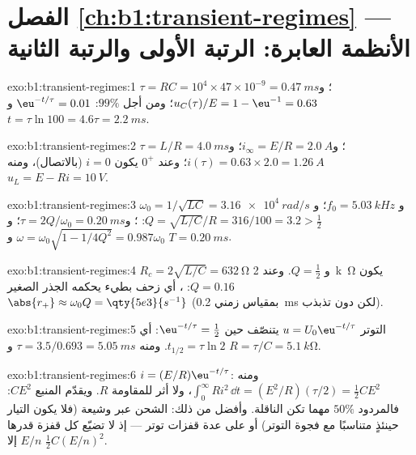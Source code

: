 \section*{الفصل \ref{ch:b1:transient-regimes} --- الأنظمة العابرة: الرتبة الأولى والرتبة الثانية}

\begin{solution}{exo:b1:transient-regimes:1}
$\tau = RC = 10^4 \times 47\times10^{-9} = \qty{0.47}{ms}$؛ و$u_C(\tau)/E
= 1 - \eu^{-1} = 0.63$؛ ومن أجل $99\%$: $\eu^{-t/\tau} = 0.01$ و $t = \tau\ln 100
= 4.6\tau = \qty{2.2}{ms}$.
\end{solution}

\begin{solution}{exo:b1:transient-regimes:2}
$\tau = L/R = \qty{4.0}{ms}$؛ و$i_\infty = E/R = \qty{2.0}{A}$؛ و$i(\tau) =
0.63 \times 2.0 = \qty{1.26}{A}$؛ وعند $0^+$ يكون $i = 0$ (بالاتصال)، ومنه
$u_L = E - Ri = \qty{10}{V}$.
\end{solution}

\begin{solution}{exo:b1:transient-regimes:3}
$\omega_0 = 1/\sqrt{LC} = \qty{3.16e4}{rad/s}$ و $f_0 = \qty{5.03}{kHz}$؛
و$Q = \sqrt{L/C}/R = 316/100 = 3.2 > \tfrac12$: ؛
و$\tau = 2Q/\omega_0 = \qty{0.20}{ms}$؛ و$\omega = \omega_0\sqrt{1 - 1/4Q^2}
= 0.987\omega_0$ و $T = \qty{0.20}{ms}$.
\end{solution}

\begin{solution}{exo:b1:transient-regimes:4}
$R_c = 2\sqrt{L/C} = \qty{632}{\ohm}$ و $Q = \tfrac12$. وعند \qty{2}{k\ohm} يكون
$Q = 0.16$: ، أي زحف بطيء يحكمه الجذر الصغير
$\abs{r_+} \approx \omega_0 Q = \qty{5e3}{s^{-1}}$ (بمقياس زمني
\qty{0.2}{ms} لكن دون تذبذب).
\end{solution}

\begin{solution}{exo:b1:transient-regimes:5}
التوتر $u = U_0\eu^{-t/\tau}$ يتنصّف حين $\eu^{-t/\tau} = \tfrac12$: أي $t_{1/2}
= \tau\ln 2$. ومنه $\tau = 3.5/0.693 = \qty{5.05}{ms}$ و $R = \tau/C =
\qty{5.1}{k\ohm}$.
\end{solution}

\begin{solution}{exo:b1:transient-regimes:6}
$i = (E/R)\eu^{-t/\tau}$: ومنه $\int_0^\infty Ri^2\,\dd t = (E^2/R)(\tau/2) =
\tfrac12 CE^2$، ولا أثر للمقاومة $R$. ويقدّم المنبع $CE^2$: فالمردود
$50\%$ مهما تكن الناقلة. وأفضل من ذلك: الشحن عبر وشيعة (فلا يكون
التيار حينئذٍ متناسبًا مع فجوة التوتر) أو على عدة
قفزات توتر --- إذ لا تضيّع كل قفزة قدرها $E/n$ إلا $\tfrac12 C(E/n)^2$.
\end{solution}

